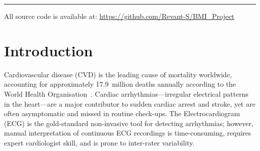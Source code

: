 \documentclass[12pt,a4paper]{article}
\begin{document}
\begin{titlepage}
    \begin{abstract}
        \noindent
        This report presents an end-to-end deep learning pipeline for binary
        classification of cardiac arrhythmias from ECG signals.
        Individual heartbeats are extracted from the MIT-BIH Arrhythmia Database
        and transformed into two-dimensional time-frequency scalograms using the
        Continuous Wavelet Transform (CWT) with the Morlet wavelet.  Two
        convolutional neural network (CNN) architectures are trained and evaluated
        on the resulting image representation: (1)~\textbf{SmallNet}, a custom
        lightweight 21-layer CNN with only 3,754 trainable parameters, and
        (2)~\textbf{GoogLeNet}, a pre-trained Inception-v1 network fine-tuned
        via transfer learning with 5,601,954 parameters.  On a balanced
        test set of 3,178 heartbeats, SmallNet achieves an AUC of 82.41\%
        after 12 epochs of CPU training, while GoogLeNet achieves a test
        accuracy of \textbf{95.81\%}, sensitivity of \textbf{96.73\%}, and an
        AUC of \textbf{98.92\%} after 25 GPU epochs.  The results demonstrate
        that the CWT-scalogram approach bridges the gap between 1D biomedical
        signal processing and powerful 2D image classification networks,
        yielding clinically relevant detection performance.
    \end{abstract}

    \vfill
    \rule{\textwidth}{0.5pt}
    {\small All source code is available at:
    \url{https://github.com/Revant-S/BMI_Project}}
\end{titlepage}

\tableofcontents
\newpage

\section{Introduction}

Cardiovascular disease (CVD) is the leading cause of mortality worldwide,
accounting for approximately 17.9~million deaths annually according to the
World Health Organisation~\cite{who2021cvd}.  Cardiac arrhythmias---irregular
electrical patterns in the heart---are a major contributor to sudden cardiac
arrest and stroke, yet are often asymptomatic and missed in routine check-ups.
The Electrocardiogram (ECG) is the gold-standard non-invasive tool for detecting
arrhythmias; however, manual interpretation of continuous ECG recordings is
time-consuming, requires expert cardiologist skill, and is prone to inter-rater
variability.
\end{document}
